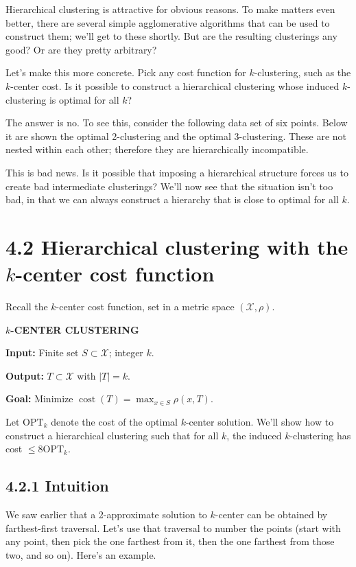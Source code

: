 \documentclass{article}
\begin{document}
Hierarchical clustering is attractive for obvious reasons. To make matters even better, there are several simple agglomerative algorithms that can be used to construct them; we'll get to these shortly. But are the resulting clusterings any good? Or are they pretty arbitrary?

Let's make this more concrete. Pick any cost function for $k$-clustering, such as the $k$-center cost. Is it possible to construct a hierarchical clustering whose induced $k$-clustering is optimal for all $k$?

The answer is no. To see this, consider the following data set of six points. Below it are shown the optimal 2-clustering and the optimal 3-clustering. These are not nested within each other; therefore they are hierarchically incompatible.

This is bad news. Is it possible that imposing a hierarchical structure forces us to create bad intermediate clusterings? We'll now see that the situation isn't too bad, in that we can always construct a hierarchy that is close to optimal for all $k$.

\section*{4.2 Hierarchical clustering with the $k$-center cost function}

Recall the $k$-center cost function, set in a metric space $(\mathcal{X}, \rho)$.

\textbf{$k$-CENTER CLUSTERING}

\textbf{Input:} Finite set $S \subset \mathcal{X}$; integer $k$.

\textbf{Output:} $T \subset \mathcal{X}$ with $|T| = k$.

\textbf{Goal:} Minimize $\operatorname{cost}(T) = \max_{x \in S} \rho(x, T)$.

Let $\mathrm{OPT}_{k}$ denote the cost of the optimal $k$-center solution. We'll show how to construct a hierarchical clustering such that for all $k$, the induced $k$-clustering has cost $\leq 8 \mathrm{OPT}_{k}$.

\subsection*{4.2.1 Intuition}

We saw earlier that a 2-approximate solution to $k$-center can be obtained by farthest-first traversal. Let's use that traversal to number the points (start with any point, then pick the one farthest from it, then the one farthest from those two, and so on). Here's an example.
\end{document}
